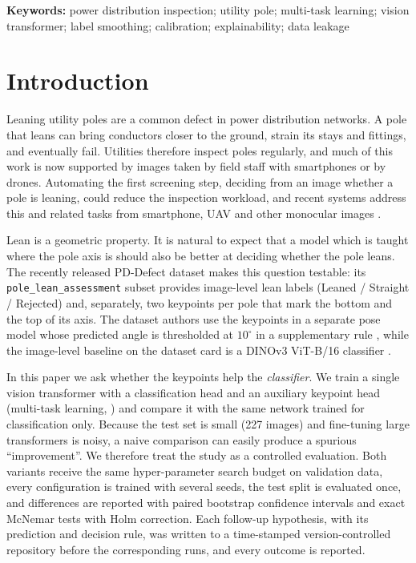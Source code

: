 \documentclass[11pt]{article}
\begin{document}
\noindent\textbf{Keywords:} power distribution inspection; utility pole; multi-task learning; vision transformer;
label smoothing; calibration; explainability; data leakage

\section{Introduction}
\label{sec:intro}

Leaning utility poles are a common defect in power distribution networks. A pole that leans can bring
conductors closer to the ground, strain its stays and fittings, and eventually fail. Utilities therefore
inspect poles regularly, and much of this work is now supported by images taken by field staff with
smartphones or by drones. Automating the first screening step, deciding from an image whether a pole is
leaning, could reduce the inspection workload, and recent systems address this and related tasks from
smartphone, UAV and other monocular images
\citep{masabathula2026smartphone,luo2026pole,wang2024leaning}.

Lean is a geometric property. It is natural to expect that a model which is taught where the pole axis is
should also be better at deciding whether the pole leans. The recently released PD-Defect dataset
\citep{pddefect_data} makes this question testable: its \texttt{pole\_lean\_assessment} subset provides
image-level lean labels (Leaned / Straight / Rejected) and, separately, two keypoints per pole that mark the
bottom and the top of its axis. The dataset authors use the keypoints in a separate pose model whose predicted
angle is thresholded at $10^\circ$ in a supplementary rule \citep{masabathula2026smartphone}, while the
image-level baseline on the dataset card is a DINOv3 ViT-B/16 classifier \citep{simeoni2025dinov3}.

In this paper we ask whether the keypoints help the \emph{classifier}. We train a single vision transformer
with a classification head and an auxiliary keypoint head (multi-task learning, \citealp{caruana1997multitask})
and compare it with the same network trained for classification only. Because the test set is small (227
images) and fine-tuning large transformers is noisy, a naive comparison can easily produce a spurious
``improvement''. We therefore treat the study as a controlled evaluation. Both variants receive the same
hyper-parameter search budget on validation data, every configuration is trained with several seeds, the test
split is evaluated once, and differences are reported with paired bootstrap confidence intervals and exact
McNemar tests with Holm correction. Each follow-up hypothesis, with its prediction and decision rule, was
written to a time-stamped version-controlled repository before the corresponding runs, and every outcome is reported.
\end{document}

